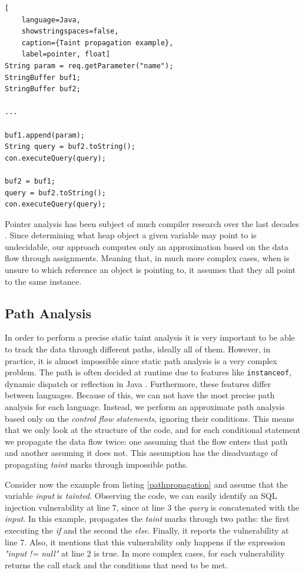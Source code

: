 \begin{lstlisting}[
    language=Java,
    showstringspaces=false,
    caption={Taint propagation example},
    label=pointer, float] 
String param = req.getParameter("name");
StringBuffer buf1;
StringBuffer buf2;

...

buf1.append(param);
String query = buf2.toString();
con.executeQuery(query);

buf2 = buf1;
query = buf2.toString();
con.executeQuery(query);
\end{lstlisting}

Pointer analysis has been subject of much compiler research over the last decades \cite{spath2016boomerang,hind2001pointer}. Since determining what heap object a given variable may point to is undecidable, our approach computes only an approximation based on the data flow through assignments. Meaning that, in much more complex cases, when \toolname{} is unsure to which reference an object is pointing to, it assumes that they all point to the same instance.


\subsection{Path Analysis} In order to perform a precise static taint analysis it is very important to be able to track the data through different paths, ideally all of them. However, in practice, it is almost impossible since static path analysis is a very complex problem. The path is often decided at runtime due to features like \texttt{instanceof}, dynamic dispatch or reflection in Java \cite{hammer2008static}. Furthermore, these features differ between languages. Because of this, we can not have the most precise path analysis for each language. Instead, we perform an approximate path analysis based only on the \textit{control flow statements}, ignoring their conditions. This means that we only look at the structure of the code, and for each conditional statement we propagate the data flow twice: one assuming that the flow enters that path and another assuming it does not. This assumption has the disadvantage of propagating \textit{taint} marks through impossible paths.

Consider now the example from listing \ref{pathpropagation} and assume that the variable \textit{input} is \textit{tainted}. Observing the code, we can easily identify an SQL injection vulnerability at line 7, since at line 3 the \textit{query} is concatenated with the \textit{input}.
In this example, \toolname{} propagates the \textit{taint} marks through two paths: the first executing the \textit{if} and the second the \textit{else}. Finally, it reports the vulnerability at line 7. Also, it mentions that this vulnerability only happens if the expression \textit{"input != null"} at line 2 is true. In more complex cases, for each vulnerability \toolname{} returns the call stack and the conditions that need to be met.

